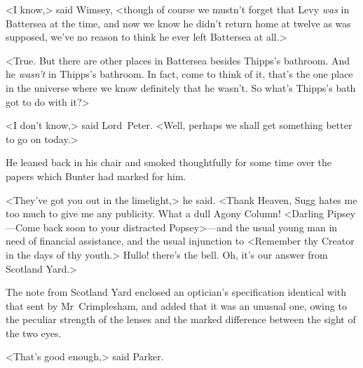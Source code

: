 <I know,> said Wimsey, <though of course we mustn't forget that Levy \textit{was} in Battersea at the time, and now we know he didn't return home at twelve as was supposed, we've no reason to think he ever left Battersea at all.>

<True. But there are other places in Battersea besides Thipps's bathroom. And he \textit{wasn't} in Thipps's bathroom. In fact, come to think of it, that's the one place in the universe where we know definitely that he wasn't. So what's Thipps's bath got to do with it?>

<I don't know,> said Lord~Peter. <Well, perhaps we shall get something better to go on today.>

He leaned back in his chair and smoked thoughtfully for some time over the papers which Bunter had marked for him.

<They've got you out in the limelight,> he said. <Thank Heaven, Sugg hates me too much to give me any publicity. What a dull Agony Column! <Darling Pipsey—Come back soon to your distracted Popsey>—and the usual young man in need of financial assistance, and the usual injunction to <Remember thy Creator in the days of thy youth.> Hullo! there's the bell. Oh, it's our answer from Scotland Yard.>

The note from Scotland Yard enclosed an optician's specification identical with that sent by Mr~Crimplesham, and added that it was an unusual one, owing to the peculiar strength of the lenses and the marked difference between the sight of the two eyes.

<That's good enough,> said Parker.

